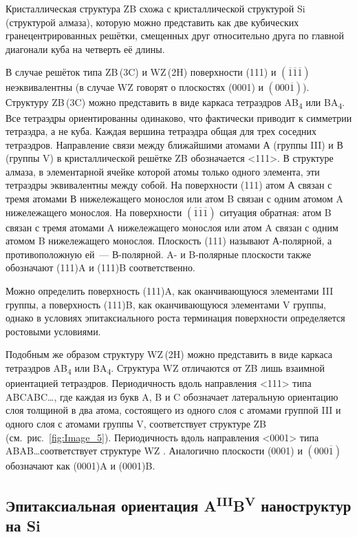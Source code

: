 Кристаллическая структура ZB схожа с кристаллической структурой Si (структурой
алмаза), которую можно представить как две кубических гранецентрированных
решётки, смещенных друг относительно друга по главной диагонали куба на
четверть её длины.

В случае решёток типа ZB\,(3C) и WZ\,(2H) поверхности (111) и
\((\overline{1}\overline{1}\overline{1})\) неэквивалентны (в случае WZ говорят
о плоскостях (0001) и \((000\overline{1})\)). Структуру ZB\,(3C) можно
представить в виде каркаса тетраэдров AB\textsubscript{4} или
BA\textsubscript{4}. Все тетраэдры ориентированны одинаково, что фактически
приводит к симметрии тетраэдра, а не куба. Каждая вершина тетраэдра общая для
трех соседних тетраэдров. Направление связи между ближайшими атомами А (группы
III) и В (группы V) в кристаллической решётке ZB обозначается <111>. В
структуре алмаза, в элементарной ячейке которой атомы только одного элемента,
эти тетраэдры эквивалентны между собой. На поверхности (111) атом А связан с
тремя атомами В нижележащего монослоя или атом B связан с одним атомом A
нижележащего монослоя. На поверхности
\((\overline{1}\overline{1}\overline{1})\) ситуация обратная: атом B связан с
тремя атомами A нижележащего монослоя или атом A связан с одним атомом B
нижележащего монослоя. Плоскость (111) называют А-полярной, а противоположную
ей~--- В-полярной. A- и B-полярные плоскости также обозначают (111)A и (111)B
соответственно.

Можно определить поверхность (111)A, как оканчивающуюся элементами III группы,
а поверхность (111)B, как оканчивающуюся элементами V группы, однако в условиях
эпитаксиального роста терминация поверхности определяется ростовыми условиями.

Подобным же образом структуру WZ\,(2H) можно представить в виде каркаса
тетраэдров AB\textsubscript{4} или BA\textsubscript{4}. Структура WZ отличаются
от ZB лишь взаимной ориентацией тетраэдров. Периодичность вдоль направления
<111> типа ABCABC\dots, где каждая из букв A, B и C обозначает латеральную
ориентацию слоя толщиной в два атома, состоящего из одного слоя с атомами
группой III и одного слоя с атомами группы V, соответствует структуре ZB
(см.~рис.~\cref{fig:Image_5}). Периодичность вдоль направления <0001> типа
ABAB\dots соответствует структуре WZ \cite{Kriegner2011}. Аналогично плоскости
(0001) и \((000\overline{1})\) обозначают как (0001)A и (0001)B.

\subsection{Эпитаксиальная ориентация
A\textsuperscript{III}B\textsuperscript{V} наноструктур на
Si}\label{subsec:ch1/sec2/sub4}

